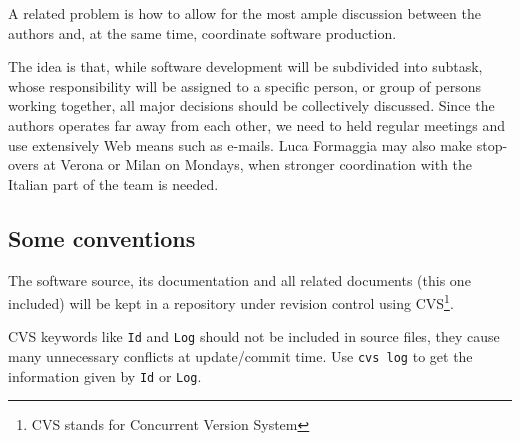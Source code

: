 A related problem is how to allow for the most ample discussion
between the authors and, at the same time, coordinate  software
production.

The idea is that, while software development will be subdivided into
subtask, whose responsibility will be assigned to a specific person,
or group of persons working together, all major decisions should be
collectively discussed. Since the authors operates far away from each
other, we need to held regular meetings and use extensively Web means
such as e-mails. Luca Formaggia may also make stop-overs at Verona or
Milan on Mondays, when stronger coordination with the Italian part of
the team is needed.
   

\subsection{Some conventions}
\label{sec:some-conventions}

The software source, its documentation and all related documents (this
one included) will be kept in a repository under revision control
using CVS\footnote{CVS stands for Concurrent Version System}.  

CVS keywords like \verb!Id! and \verb!Log! should not be included in source files,
they cause many unnecessary conflicts at update/commit time. Use 
\verb!cvs log! to get the information given by \verb!Id! or \verb!Log!.
